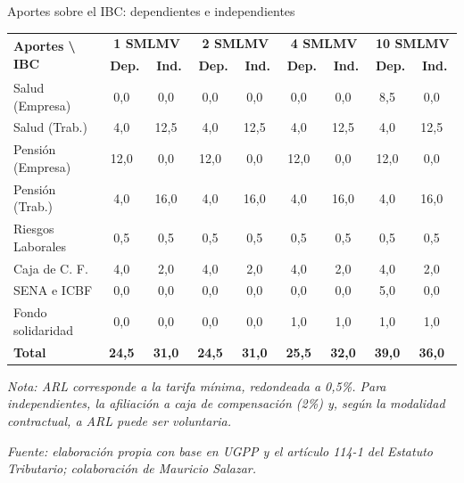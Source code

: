 \begin{frame}{Aportes sobre el IBC: dependientes e independientes}
\begin{table}[h!]
\centering
\small
\begin{tabular}{|l|cc|cc|cc|cc|}
\hline
\multirow{2}{*}{\textbf{Aportes \textbackslash{} IBC}} & \multicolumn{2}{c}{\textbf{1 SMLMV}} & \multicolumn{2}{|c|}{\textbf{2 SMLMV}} & \multicolumn{2}{|c|}{\textbf{4 SMLMV}} & \multicolumn{2}{|c|}{\textbf{10 SMLMV}} \\
& \textbf{Dep.} & \textbf{Ind.} & \textbf{Dep.} & \textbf{Ind.} & \textbf{Dep.} & \textbf{Ind.} & \textbf{Dep.} & \textbf{Ind.} \\ \hline
Salud (Empresa)     & 0,0\  & 0,0\  & 0,0\  & 0,0\  & 0,0\  & 0,0\  & 8,5\  & 0,0\  \\
Salud (Trab.)  & 4,0\  & 12,5\ & 4,0\  & 12,5\ & 4,0\  & 12,5\ & 4,0\  & 12,5\ \\
Pensión (Empresa)   & 12,0\ & 0,0\  & 12,0\ & 0,0\  & 12,0\ & 0,0\  & 12,0\ & 0,0\  \\
Pensión (Trab.) & 4,0\  & 16,0\ & 4,0\  & 16,0\ & 4,0\  & 16,0\ & 4,0\  & 16,0\ \\
Riesgos Laborales        & 0,5\  & 0,5\  & 0,5\  & 0,5\  & 0,5\  & 0,5\  & 0,5\  & 0,5\  \\
Caja de C. F.     & 4,0\  & 2,0\  & 4,0\  & 2,0\  & 4,0\  & 2,0\  & 4,0\  & 2,0\  \\
SENA e ICBF               & 0,0\  & 0,0\  & 0,0\  & 0,0\  & 0,0\  & 0,0\  & 5,0\  & 0,0\  \\
Fondo solidaridad        & 0,0\  & 0,0\  & 0,0\  & 0,0\  & 1,0\  & 1,0\  & 1,0\  & 1,0\  \\ \hline
\textbf{Total}           & \textbf{24,5}\ & \textbf{31,0}\ & \textbf{24,5}\ & \textbf{31,0}\ & \textbf{25,5}\ & \textbf{32,0}\ & \textbf{39,0}\ & \textbf{36,0}\ \\ \hline
\end{tabular}
\vspace{0.1cm} 
\par \scriptsize{\textit{Nota: ARL corresponde a la tarifa mínima, redondeada a 0,5\%. Para independientes, la afiliación a caja de compensación (2\%) y, según la modalidad contractual, a ARL puede ser voluntaria.}}

\vspace{0.08cm}
\par \scriptsize{\textit{Fuente: elaboración propia con base en UGPP y el artículo 114-1 del Estatuto Tributario; colaboración de Mauricio Salazar.}}
\end{table}

\end{frame}
